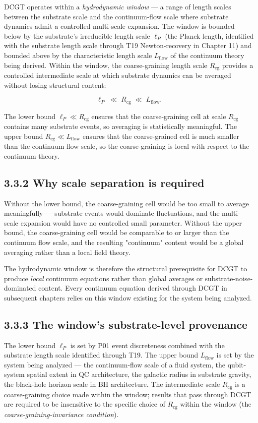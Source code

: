 \documentclass[11pt]{book}
\begin{document}
DCGT operates within a \textit{hydrodynamic window} — a range of length scales between the substrate scale and the continuum-flow scale where substrate dynamics admit a controlled multi-scale expansion. The window is bounded below by the substrate's irreducible length scale $\ell_P$ (the Planck length, identified with the substrate length scale through T19 Newton-recovery in Chapter 11) and bounded above by the characteristic length scale $L_\mathrm{flow}$ of the continuum theory being derived. Within the window, the coarse-graining length scale $R_\mathrm{cg}$ provides a controlled intermediate scale at which substrate dynamics can be averaged without losing structural content:

\[
\ell_P \;\ll\; R_\mathrm{cg} \;\ll\; L_\mathrm{flow}.
\]

The lower bound $\ell_P \ll R_\mathrm{cg}$ ensures that the coarse-graining cell at scale $R_\mathrm{cg}$ contains many substrate events, so averaging is statistically meaningful. The upper bound $R_\mathrm{cg} \ll L_\mathrm{flow}$ ensures that the coarse-grained cell is much smaller than the continuum flow scale, so the coarse-graining is local with respect to the continuum theory.

\subsection{3.3.2 Why scale separation is required}

Without the lower bound, the coarse-graining cell would be too small to average meaningfully — substrate events would dominate fluctuations, and the multi-scale expansion would have no controlled small parameter. Without the upper bound, the coarse-graining cell would be comparable to or larger than the continuum flow scale, and the resulting "continuum" content would be a global averaging rather than a local field theory.

The hydrodynamic window is therefore the structural prerequisite for DCGT to produce \textit{local} continuum equations rather than global averages or substrate-noise-dominated content. Every continuum equation derived through DCGT in subsequent chapters relies on this window existing for the system being analyzed.

\subsection{3.3.3 The window's substrate-level provenance}

The lower bound $\ell_P$ is set by P01 event discreteness combined with the substrate length scale identified through T19. The upper bound $L_\mathrm{flow}$ is set by the system being analyzed — the continuum-flow scale of a fluid system, the qubit-system spatial extent in QC architecture, the galactic radius in substrate gravity, the black-hole horizon scale in BH architecture. The intermediate scale $R_\mathrm{cg}$ is a coarse-graining choice made within the window; results that pass through DCGT are required to be insensitive to the specific choice of $R_\mathrm{cg}$ within the window (the \textit{coarse-graining-invariance condition}).
\end{document}
